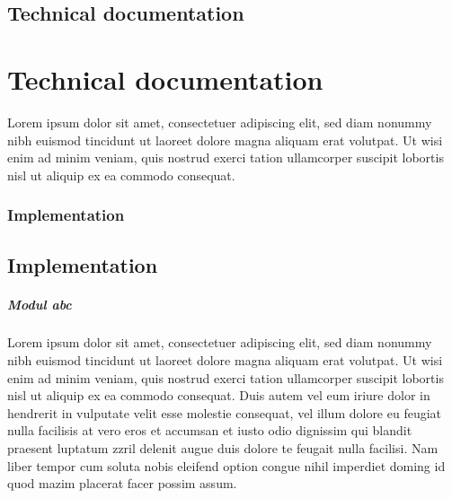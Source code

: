 \newpage
\thispagestyle{plain}
{
	\section{Technical documentation}
}
{
	\chapter{Technical documentation}
}
 \label{technical_documentation}
Lorem ipsum dolor sit amet, consectetuer adipiscing elit, sed diam nonummy nibh euismod tincidunt ut laoreet dolore magna aliquam erat volutpat. Ut wisi enim ad minim veniam, quis nostrud exerci tation ullamcorper suscipit lobortis nisl ut aliquip ex ea commodo consequat. 
{
	\subsection{Implementation}
}
{
	\section{Implementation}
}
\paragraph{Modul abc}
Lorem ipsum dolor sit amet, consectetuer adipiscing elit, sed diam nonummy nibh euismod tincidunt ut laoreet dolore magna aliquam erat volutpat. Ut wisi enim ad minim veniam, quis nostrud exerci tation ullamcorper suscipit lobortis nisl ut aliquip ex ea commodo consequat. Duis autem vel eum iriure dolor in hendrerit in vulputate velit esse molestie consequat, vel illum dolore eu feugiat nulla facilisis at vero eros et accumsan et iusto odio dignissim qui blandit praesent luptatum zzril delenit augue duis dolore te feugait nulla facilisi. Nam liber tempor cum soluta nobis eleifend option congue nihil imperdiet doming id quod mazim placerat facer possim assum.
